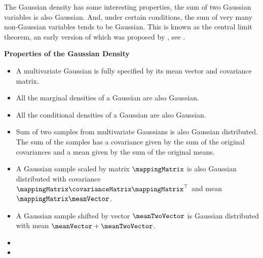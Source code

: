 \begin{boxfloat}
  The Gaussian density has some interesting properties, the sum of two
  Gaussian variables is also Gaussian.  And, under certain conditions,
  the sum of very many non-Gaussian variables tends to be
  Gaussian. This is known as the central limit theorem, an early version of which was proposed by
  \cite{Laplace:nombres10}, see
  .

  \noindent\textbf{Properties of the Gaussian Density}

  \begin{itemize}
  \item A multivariate Gaussian is fully specified by its mean vector and
    covariance matrix.
    
  \item All the marginal densities of a Gaussian are also Gaussian. 
    
  \item All the conditional densities of a Gaussian are also Gaussian.

  \item Sum of two samples from multivariate Gaussians is also
    Gaussian distributed. The sum of the samples has a covariance
    given by the sum of the original covariances and a mean given by
    the sum of the original means.
  \item A Gaussian sample scaled by matrix $\mappingMatrix$ is also
    Gaussian distributed with covariance
    $\mappingMatrix\covarianceMatrix\mappingMatrix^\top$ and mean
    $\mappingMatrix\meanVector$.
  \item A Gaussian sample shifted by vector $\meanTwoVector$ is
    Gaussian distributed with mean $\meanVector+\meanTwoVector$.
  \item {}
  \item {}
  \end{itemize}
\end{boxfloat}

